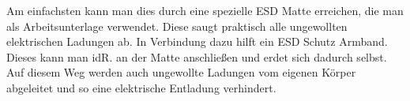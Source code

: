 Am einfachsten kann man dies durch eine spezielle ESD Matte erreichen, die man als Arbeitsunterlage verwendet. Diese saugt praktisch alle ungewollten elektrischen Ladungen ab.
In Verbindung dazu hilft ein ESD Schutz Armband.
Dieses kann man idR. an der Matte anschließen und erdet sich dadurch selbst.
Auf diesem Weg werden auch ungewollte Ladungen vom eigenen Körper abgeleitet und so eine elektrische Entladung verhindert.